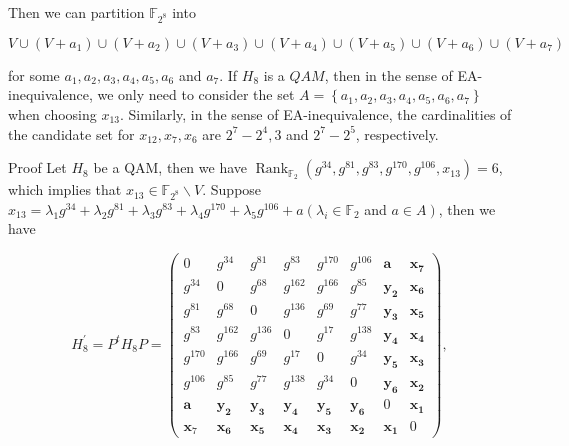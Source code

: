 \documentclass[10pt]{article}
\begin{document}
Then we can partition $\mathbb{F}_{2^{8}}$ into

$$
V \cup\left(V+a_{1}\right) \cup\left(V+a_{2}\right) \cup\left(V+a_{3}\right) \cup\left(V+a_{4}\right) \cup\left(V+a_{5}\right) \cup\left(V+a_{6}\right) \cup\left(V+a_{7}\right)
$$

for some $a_{1}, a_{2}, a_{3}, a_{4}, a_{5}, a_{6}$ and $a_{7}$. If $H_{8}$ is a $Q A M$, then in the sense of EA-inequivalence, we only need to consider the set $A=\left\{a_{1}, a_{2}, a_{3}, a_{4}, a_{5}, a_{6}, a_{7}\right\}$ when choosing $x_{13}$. Similarly, in the sense of EA-inequivalence, the cardinalities of the candidate set for $x_{12}, x_{7}, x_{6}$ are $2^{7} -2^{4}, 3$ and $2^{7}-2^{5}$, respectively.

Proof Let $H_{8}$ be a QAM, then we have $\operatorname{Rank}_{\mathbb{F}_{2}}\left(g^{34}, g^{81}, g^{83}, g^{170}, g^{106}, x_{13}\right)=6$, which implies that $x_{13} \in \mathbb{F}_{2^{8}} \backslash V$. Suppose $x_{13}=\lambda_{1} g^{34}+\lambda_{2} g^{81}+\lambda_{3} g^{83}+\lambda_{4} g^{170}+\lambda_{5} g^{106}+a \left(\lambda_{i} \in \mathbb{F}_{2}\right.$ and $\left.a \in A\right)$, then we have

$$
H_{8}^{\prime}=P^{t} H_{8} P=\left(\begin{array}{cccccccc}
0 & g^{34} & g^{81} & g^{83} & g^{170} & g^{106} & \mathbf{a} & \mathbf{x}_{\mathbf{7}} \\
g^{34} & 0 & g^{68} & g^{162} & g^{166} & g^{85} & \mathbf{y}_{\mathbf{2}} & \mathbf{x}_{\mathbf{6}} \\
g^{81} & g^{68} & 0 & g^{136} & g^{69} & g^{77} & \mathbf{y}_{\mathbf{3}} & \mathbf{x}_{\mathbf{5}} \\
g^{83} & g^{162} & g^{136} & 0 & g^{17} & g^{138} & \mathbf{y}_{\mathbf{4}} & \mathbf{x}_{\mathbf{4}} \\
g^{170} & g^{166} & g^{69} & g^{17} & 0 & g^{34} & \mathbf{y}_{\mathbf{5}} & \mathbf{x}_{\mathbf{3}} \\
g^{106} & g^{85} & g^{77} & g^{138} & g^{34} & 0 & \mathbf{y}_{\mathbf{6}} & \mathbf{x}_{\mathbf{2}} \\
\mathbf{a} & \mathbf{y}_{\mathbf{2}} & \mathbf{y}_{\mathbf{3}} & \mathbf{y}_{\mathbf{4}} & \mathbf{y}_{\mathbf{5}} & \mathbf{y}_{\mathbf{6}} & 0 & \mathbf{x}_{\mathbf{1}} \\
\mathbf{x}_{7} & \mathbf{x}_{\mathbf{6}} & \mathbf{x}_{\mathbf{5}} & \mathbf{x}_{\mathbf{4}} & \mathbf{x}_{\mathbf{3}} & \mathbf{x}_{\mathbf{2}} & \mathbf{x}_{\mathbf{1}} & 0
\end{array}\right),
$$
\end{document}
